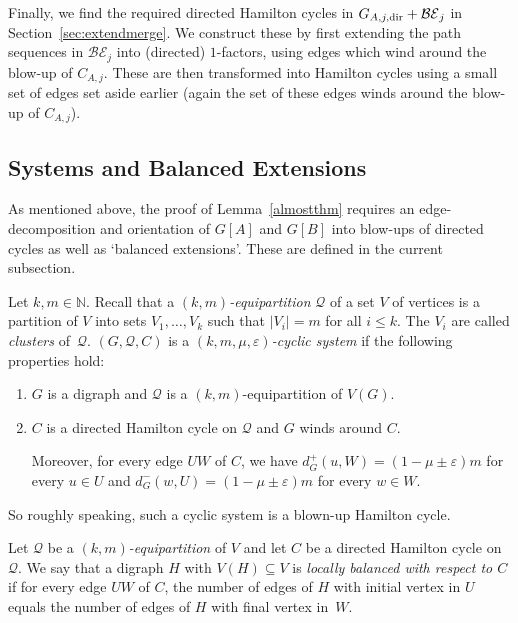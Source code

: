 \documentclass{memo-l}
\def\COMMENT#1{}
\def\eps{\varepsilon}
\numberwithin{section}{chapter}
\numberwithin{equation}{section}
\numberwithin{firstthm}{section}
\numberwithin{figure}{section}
\begin{document}
{Finally, we find the required directed Hamilton cycles in $G_{A,j,{\rm dir}}+ \mathcal{BE}_j$ in Section~\ref{sec:extendmerge}.
We construct these by first extending the path sequences in $\mathcal{BE}_j$ into (directed) $1$-factors, using edges which wind around the blow-up of $C_{A,j}$.
These are then transformed into Hamilton cycles using a small set of edges set aside earlier (again the set of these edges winds around the blow-up of $C_{A,j}$).

\subsection{Systems and Balanced Extensions} \label{system}
As mentioned above, the proof of Lemma~\ref{almostthm} requires an edge-decomposition and orientation of $G[A]$ and
$G[B]$ into blow-ups of directed cycles as well as `balanced extensions'. These are defined in the current subsection.

Let $k,m \in \mathbb{N}$. Recall that
a \emph{$(k,m)$-equipartition} $\mathcal{Q}$ of a set $V$ of vertices is a partition of $V$ into sets $V_1, \dots, V_k$ such that $|V_i| = m$ for all $i \le k$.
The $V_i$ are called \emph{clusters} of~$\mathcal{Q}$.
$(G, \mathcal Q, C)$ is a \emph{$(k,m, \mu, \eps )$-cyclic system}
 if the following properties hold:
\begin{enumerate}[label={(Sys{\arabic*})}]
	\item $G$ is a digraph and $\mathcal{Q}$ is a $(k,m)$-equipartition of $V(G)$.
	\item $C$ is a directed Hamilton cycle on $\mathcal{Q}$ and $G$ winds around $C$.%
    \COMMENT{Added the "winding around bit" since we need it in the proof of Lemma~\ref{merging}}
Moreover, for every edge $UW$ of $C$,
we have $d^+_G(u,W) = (1- \mu \pm \eps)m $ for every $u \in U$ and $d^-_G(w,U) = (1- \mu \pm \eps)m$ for every $w \in W$.
\end{enumerate}
So roughly speaking, such a cyclic system is a blown-up Hamilton cycle.

Let $\mathcal{Q}$ be a \emph{$(k,m)$-equipartition} of $V$ and let $C$ be a directed Hamilton cycle on~$\mathcal{Q}$.
We say that a digraph $H$ with $V(H)\subseteq V$ is \emph{locally balanced with respect to $C$} if for every edge $UW$
of $C$, the number of edges of $H$ with initial vertex in $U$ equals the number of edges of $H$ with final vertex in~$W$.

}
\end{document}
